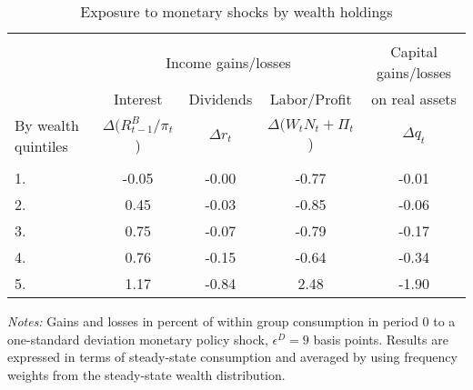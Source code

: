 \begin{table} \caption{Exposure to monetary shocks by wealth holdings} \label{Tab:RD} 
\begin{center}
\begin{threeparttable}
\begin{tabular*}{\textwidth}{l @{\extracolsep{\fill}} cccc}
 \hline \hline 
\\ &\multicolumn{3}{c}{Income gains/losses} & Capital gains/losses   \\ \cline{2-4} 
                       & Interest  &  Dividends  & Labor/Profit & on real assets    \\
By wealth quintiles     & $\Delta (R^B_{t-1}/\pi_t$)   & $\Delta r_t$ &  $\Delta (W_tN_t+\Pi_t$) & $\Delta q_t$   \\ \hline 
\\ 1.   &       -0.05 &    -0.00 &    -0.77 &    -0.01 
\\ 2.  &        0.45 &    -0.03 &    -0.85 &    -0.06 
\\ 3.  &        0.75 &    -0.07 &    -0.79 &    -0.17 
\\ 4.  &        0.76 &    -0.15 &    -0.64 &    -0.34 
\\ 5.  &        1.17 &    -0.84 &     2.48 &    -1.90 
\\ \hline 
\end{tabular*} 
\begin{small}
\begin{tablenotes}
\item \textit{Notes:} Gains and losses in percent of within group consumption in period 0 to a one-standard deviation monetary policy shock, $\epsilon^D=9$ basis points. Results are expressed in terms of steady-state consumption and averaged by using frequency weights from the steady-state wealth distribution. 
\end{tablenotes}
\end{small}
\end{threeparttable}
\end{center}
\end{table}

